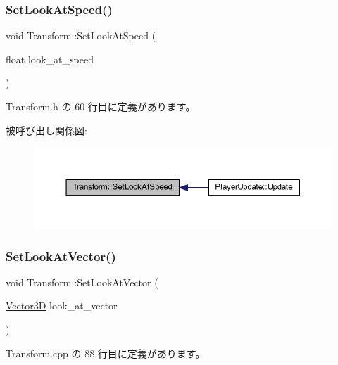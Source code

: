\subsubsection{\texorpdfstring{Set\+Look\+At\+Speed()}{SetLookAtSpeed()}}
{\footnotesize\ttfamily void Transform\+::\+Set\+Look\+At\+Speed (\begin{DoxyParamCaption}\item[{float}]{look\+\_\+at\+\_\+speed }\end{DoxyParamCaption})\hspace{0.3cm}{\ttfamily [inline]}}



 Transform.\+h の 60 行目に定義があります。

被呼び出し関係図\+:\nopagebreak
\begin{figure}[H]
\begin{center}
\leavevmode
\includegraphics[width=350pt]{class_transform_ab6f7342cb4eca555c02a85c999d499dc_icgraph}
\end{center}
\end{figure}
\mbox{\label{class_transform_a39b78acbdbf3ee98cad0c4e640988745}} 
\subsubsection{\texorpdfstring{Set\+Look\+At\+Vector()}{SetLookAtVector()}}
{\footnotesize\ttfamily void Transform\+::\+Set\+Look\+At\+Vector (\begin{DoxyParamCaption}\item[{\mbox{\hyperlink{class_vector3_d}{Vector3D}}}]{look\+\_\+at\+\_\+vector }\end{DoxyParamCaption})}



 Transform.\+cpp の 88 行目に定義があります。

